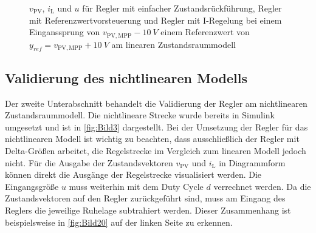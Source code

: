 \begin{figure}[H]
    \centering
    \caption[Reglervergleich für das lineare Zustandsraummodell]{$v_{\mathrm{PV}}$, $i_{\mathrm{L}}$ und $u$ für Regler mit einfacher Zustandsrückführung, Regler mit Referenzwertvorsteuerung und Regler mit I-Regelung bei einem Einganssprung von $v_{\mathrm{PV,MPP}} - \SI{10}{V}$ \bzw einem Referenzwert von $y_{ref} = v_{\mathrm{PV,MPP}} + \SI{10}{V}$ am linearen Zustandsraummodell}
    \label{fig:Bild19}
\end{figure}

\subsection{Validierung des nichtlinearen Modells} \label{sec:Vergleich_nichtlinear}

Der zweite Unterabschnitt behandelt die Validierung der Regler am nichtlinearen Zustandsraummodell. Die nichtlineare Strecke wurde bereits in Simulink umgesetzt und ist in \autoref{fig:Bild3} dargestellt. Bei der Umsetzung der Regler für das nichtlinearen Modell ist wichtig zu beachten, dass ausschließlich der Regler mit Delta-Größen arbeitet, die Regelstrecke im Vergleich zum linearen Modell jedoch nicht. Für die Ausgabe der Zustandsvektoren $v_{\mathrm{PV}}$ und $i_{\mathrm{L}}$ in Diagrammform können direkt die Ausgänge der Regelstrecke visualisiert werden. Die Eingangsgröße $u$ muss weiterhin mit dem Duty Cycle $d$ verrechnet werden. Da die Zustandsvektoren auf den Regler zurückgeführt sind, muss am Eingang des Reglers die jeweilige Ruhelage subtrahiert werden. Dieser Zusammenhang ist beispielsweise in \autoref{fig:Bild20} auf der linken Seite zu erkennen. 

